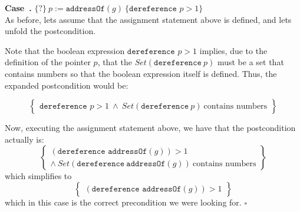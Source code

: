 \documentclass[11pt]{article}
\newcounter{definition}
\newcounter{case}
\newenvironment{case}[1][]{\stepcounter{case}\par\medskip\noindent
\textbf{Case~\thesection.\thecase #1} \rmfamily}{\medskip\hfill$\square$}
\newcounter{result}
\begin{document}
\begin{case} $\{?\}\ p:=\texttt{addressOf}(g)\ \{\texttt{dereference } p>1\}$ \\
As before, lets assume that the assignment statement above is defined, and lets unfold the postcondition.

Note that the boolean expression $\texttt{dereference } p>1$ implies, due to the definition of the pointer $p$, that the $Set(\texttt{dereference}\ p)$ must be a set that contains numbers so that the boolean expression itself is defined. Thus, the expanded postcondition would be:

$$\left\{
 \begin{matrix}
\texttt{dereference } p>1\ \wedge\ Set(\texttt{dereference}\ p)\ \text{contains numbers}
\end{matrix}
\right\}$$

Now, executing the assignment statement above, we have that the postcondition actually is:
$$\left\{
 \begin{matrix}
(\texttt{dereference } \texttt{addressOf}(g))>1 \\ \wedge\ Set(\texttt{dereference}\ \texttt{addressOf}(g))\ \text{contains numbers}
\end{matrix}
\right\}$$
which simplifies to
$$\left\{
 \begin{matrix}
(\texttt{dereference } \texttt{addressOf}(g))>1
\end{matrix}
\right\}$$
which in this case is the correct precondition we were looking for.
\end{case}


%
%
\end{document}
